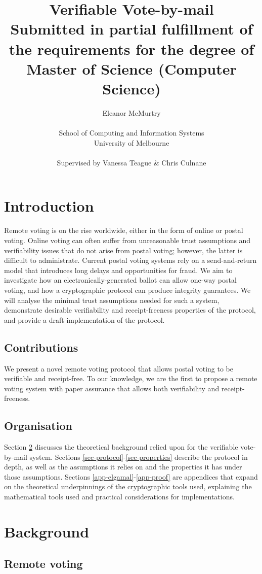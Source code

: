 \documentclass[11pt,twoside,a4paper]{article}
\title{Verifiable Vote-by-mail\\\large Submitted in partial fulfillment of the requirements for the degree of Master of Science (Computer Science)}
\author{Eleanor McMurtry\\\\School of Computing and Information Systems\\University of Melbourne\\\\Supervised by Vanessa Teague \& Chris Culnane}
\theoremstyle{definition}
\begin{document}
\maketitle
\tableofcontents
\vfill\pagebreak
\section{Introduction}
Remote voting is on the rise worldwide, either in the form of online or postal voting. Online voting can often suffer from unreasonable trust assumptions and verifiability issues that do not arise from postal voting; however, the latter is difficult to administrate. Current postal voting systems rely on a send-and-return model that introduces long delays and opportunities for fraud. We aim to investigate how an electronically-generated ballot can allow one-way postal voting, and how a cryptographic protocol can produce integrity guarantees. We will analyse the minimal trust assumptions needed for such a system, demonstrate desirable verifiability and receipt-freeness properties of the protocol, and provide a draft implementation of the protocol.
\subsection{Contributions}
We present a novel remote voting protocol that allows postal voting to be verifiable and receipt-free. To our knowledge, we are the first to propose a remote voting system with paper assurance that allows both verifiability and receipt-freeness.
\subsection{Organisation}
Section \ref{sec-background} discusses the theoretical background relied upon for the verifiable vote-by-mail system. Sections \ref{sec-protocol}-\ref{sec-properties} describe the protocol in depth, as well as the assumptions it relies on and the properties it has under those assumptions. Sections \ref{app-elgamal}-\ref{app-proof}  are appendices that expand on the theoretical underpinnings of the cryptographic tools used, explaining the mathematical tools used and practical considerations for implementations.
\section{Background}\label{sec-background}
\subsection{Remote voting}
\end{document}
